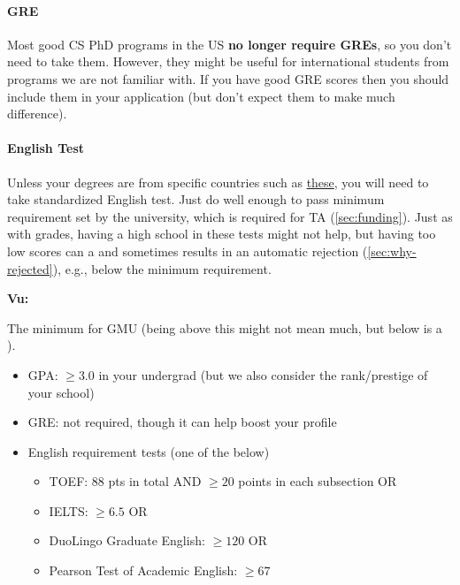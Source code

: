 \documentclass[oneside,11pt]{book}
\newenvironment{commentbox}[1][]{
  \small
  \begin{mybox}
    {\small \textbf{#1}}
  }{
  \end{mybox}
}
\newcommand{\red}[1]{{\color{red}{#1}}}
\begin{document}
\paragraph{GRE} Most good CS PhD programs in the US \textbf{no longer require GREs}, so you don't need to take them. However, they might be useful for international students from programs we are not familiar with.  If you have good GRE scores then you should include them in your application (but don't expect them to make much difference).  
\paragraph{English Test} Unless your degrees are from specific countries such as \href{https://github.com/dynaroars/dynaroars.github.io/wiki/About-GMU#standard-tests-waiver-eligible-countries}{these}, you will need to
take standardized English test. Just do well enough to pass minimum requirement set by the university, which is required for TA (\autoref{sec:funding}). Just as with grades, having a high school in these tests might not help, but having too low scores can a \red{red flag} and sometimes results in an automatic rejection (\autoref{sec:why-rejected}), e.g., below the minimum requirement.


\begin{commentbox}[Vu:]
  The minimum for GMU (being above this might not mean much, but below is a \red{red flag}).
  \begin{itemize}
    \item GPA: $\ge 3.0$ in your undergrad (but we also consider the rank/prestige of your school)
    \item GRE: not required, though it can help boost your profile
    \item English requirement tests (one of the below)
          \begin{itemize}
            \item TOEF: 88 pts in total AND $\ge 20$ points in each subsection OR
            \item IELTS: $\ge 6.5$ OR
            \item DuoLingo Graduate English: $\ge 120$ OR
            \item Pearson Test of Academic English: $\ge 67$
          \end{itemize}
  \end{itemize}
\end{commentbox}
\end{document}
